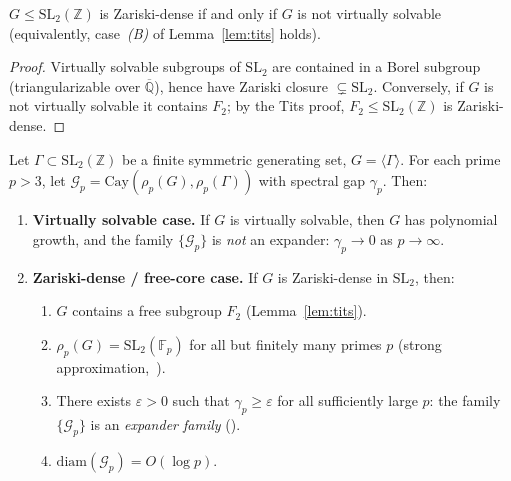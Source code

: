 \begin{lemma}
  \label{lem:zariski_free}
  $G \leq \mathrm{SL}_2(\mathbb{Z})$ is Zariski-dense if and only if $G$ is not
  virtually solvable (equivalently, case~\emph{(B)} of Lemma~\ref{lem:tits} holds).
\end{lemma}

\begin{proof}
  Virtually solvable subgroups of $\mathrm{SL}_2$ are contained in a Borel subgroup
  (triangularizable over $\overline{\mathbb{Q}}$), hence have Zariski closure
  $\subsetneq \mathrm{SL}_2$.  Conversely, if $G$ is not virtually solvable it
  contains $F_2$; by the Tits proof, $F_2 \leq \mathrm{SL}_2(\mathbb{Z})$ is
  Zariski-dense.
\end{proof}

\begin{theorem}
  \label{thm:expansion}
  Let $\Gamma \subset \mathrm{SL}_2(\mathbb{Z})$ be a finite symmetric generating set,
  $G = \langle \Gamma \rangle$.  For each prime $p > 3$, let
  $\mathcal{G}_p = \mathrm{Cay}(\rho_p(G), \rho_p(\Gamma))$ with spectral gap $\gamma_p$.
  Then:
  \begin{enumerate}
    \item[\emph{(A)}] \textbf{Virtually solvable case.}
      If $G$ is virtually solvable, then $G$ has polynomial growth, and the family
      $\{\mathcal{G}_p\}$ is \emph{not} an expander: $\gamma_p \to 0$ as $p \to \infty$.

    \item[\emph{(B)}] \textbf{Zariski-dense / free-core case.}
      If $G$ is Zariski-dense in $\mathrm{SL}_2$, then:
      \begin{enumerate}
        \item[\emph{(i)}] $G$ contains a free subgroup $F_2$ (Lemma~\ref{lem:tits}).
        \item[\emph{(ii)}] $\rho_p(G) = \mathrm{SL}_2(\mathbb{F}_p)$ for all but finitely
          many primes $p$ (strong approximation,~\cite{matthews1984congruence}).
        \item[\emph{(iii)}] There exists $\varepsilon > 0$ such that
          $\gamma_p \geq \varepsilon$ for all sufficiently large $p$:
          the family $\{\mathcal{G}_p\}$ is an \emph{expander family}
          (\cite{bourgain2008spectral}).
        \item[\emph{(iv)}] $\mathrm{diam}(\mathcal{G}_p) = O(\log p)$.
      \end{enumerate}
  \end{enumerate}
\end{theorem}

